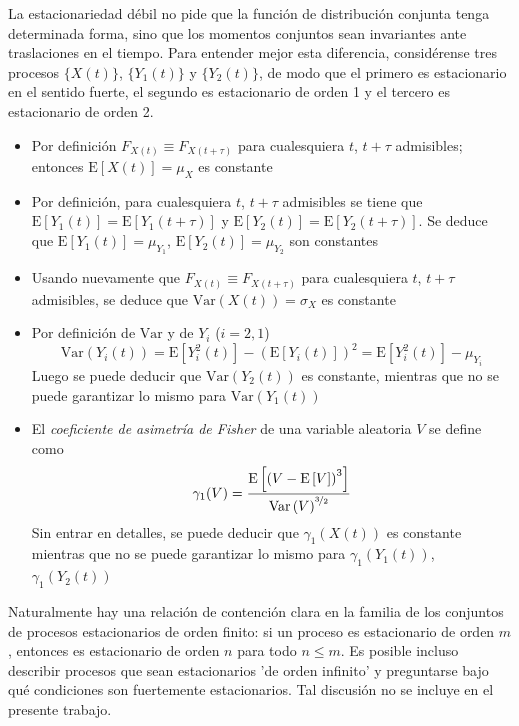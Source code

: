 \documentclass[12pt,a4paper]{mitthesis}
\newcommand{\E}[1]{\mathrm{E}\left[ #1 \right]}
\newcommand{\Var}[1]{\mathrm{Var}\left( #1 \right)}
\begin{document}
La estacionariedad d\'ebil no pide que la funci\'on de distribuci\'on conjunta tenga determinada 
forma, sino que los momentos conjuntos sean invariantes ante traslaciones en el tiempo. Para 
entender mejor esta diferencia, consid\'erense tres procesos $\{X(t)\}$, $\{Y_1(t)\}$ y 
$\{Y_2(t)\}$, de modo que el primero es estacionario en el sentido fuerte, el segundo es 
estacionario de orden 1 y el tercero es estacionario de orden 2.
\begin{itemize}
\item Por definici\'on $F_{X(t) } \equiv F_{X(t+\tau)}$ para cualesquiera $t$, $t+\tau$ 
admisibles; entonces $\E{X(t)} = \mu_X$ es constante
\item Por definici\'on, para cualesquiera $t$, $t+\tau$ admisibles se tiene que 
$\E{Y_1(t)}=\E{Y_1(t+\tau)}$ y $\E{Y_2(t)}=\E{Y_2(t+\tau)}$. Se deduce que 
$\E{Y_1(t)} = \mu_{Y_1}$, $\E{Y_2(t)} = \mu_{Y_2}$ son constantes
\item Usando nuevamente que $F_{X(t) } \equiv F_{X(t+\tau)}$ para cualesquiera $t$, $t+\tau$
admisibles, se deduce que $\Var{X(t)} = \sigma_X$ es constante
\item Por definici\'on de $\mathrm{Var}$ y de $Y_i$ ($i=2,1$) 
$$\Var{Y_i(t)} = \E{Y_i^{2}(t)} - \left( \E{Y_i(t)} \right)^{2} = \E{Y_i^{2}(t)} - \mu_{Y_i}$$
Luego se puede deducir que $\Var{Y_2(t)}$ es constante, mientras que no se puede garantizar lo 
mismo para $\Var{Y_1(t)}$
\item El \textit{coeficiente de asimetr\'ia de Fisher} de una variable aleatoria $V$ se define como
$$ \gamma_1(V) = \frac{\E{\left(V-\E{V}\right)^{3}}}{\Var{V}^{\nicefrac{3}{2}}} $$
Sin entrar en detalles, se puede deducir que $\gamma_1(X(t))$ es constante mientras que no se
puede garantizar lo mismo para $\gamma_1(Y_1(t))$, $\gamma_1(Y_2(t))$
\end{itemize}

Naturalmente hay una relaci\'on de contenci\'on clara en la familia de los conjuntos de procesos 
estacionarios de orden finito: si un proceso es estacionario de orden $m$, entonces es estacionario 
de orden $n$ para todo $n \leq m$. Es posible incluso describir procesos que sean estacionarios 'de 
orden infinito' y preguntarse bajo qu\'e condiciones son fuertemente estacionarios.
Tal discusi\'on no se incluye en el presente trabajo.
\end{document}
